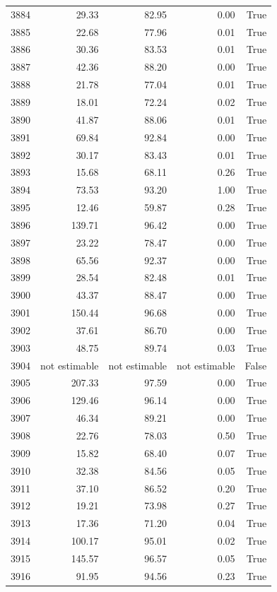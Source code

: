 \begin{longtable}{rrrrr}
3884 & 29.33 & 82.95 & 0.00 & True \\
3885 & 22.68 & 77.96 & 0.01 & True \\
3886 & 30.36 & 83.53 & 0.01 & True \\
3887 & 42.36 & 88.20 & 0.00 & True \\
3888 & 21.78 & 77.04 & 0.01 & True \\
3889 & 18.01 & 72.24 & 0.02 & True \\
3890 & 41.87 & 88.06 & 0.01 & True \\
3891 & 69.84 & 92.84 & 0.00 & True \\
3892 & 30.17 & 83.43 & 0.01 & True \\
3893 & 15.68 & 68.11 & 0.26 & True \\
3894 & 73.53 & 93.20 & 1.00 & True \\
3895 & 12.46 & 59.87 & 0.28 & True \\
3896 & 139.71 & 96.42 & 0.00 & True \\
3897 & 23.22 & 78.47 & 0.00 & True \\
3898 & 65.56 & 92.37 & 0.00 & True \\
3899 & 28.54 & 82.48 & 0.01 & True \\
3900 & 43.37 & 88.47 & 0.00 & True \\
3901 & 150.44 & 96.68 & 0.00 & True \\
3902 & 37.61 & 86.70 & 0.00 & True \\
3903 & 48.75 & 89.74 & 0.03 & True \\
3904 & not estimable & not estimable & not estimable & False \\
3905 & 207.33 & 97.59 & 0.00 & True \\
3906 & 129.46 & 96.14 & 0.00 & True \\
3907 & 46.34 & 89.21 & 0.00 & True \\
3908 & 22.76 & 78.03 & 0.50 & True \\
3909 & 15.82 & 68.40 & 0.07 & True \\
3910 & 32.38 & 84.56 & 0.05 & True \\
3911 & 37.10 & 86.52 & 0.20 & True \\
3912 & 19.21 & 73.98 & 0.27 & True \\
3913 & 17.36 & 71.20 & 0.04 & True \\
3914 & 100.17 & 95.01 & 0.02 & True \\
3915 & 145.57 & 96.57 & 0.05 & True \\
3916 & 91.95 & 94.56 & 0.23 & True \\

\end{longtable}
